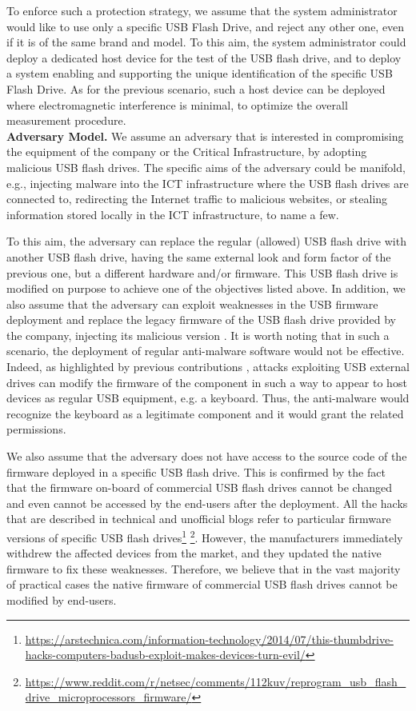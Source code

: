 \documentclass[acmsmall, authorversion]{acmart}
\begin{document}
To enforce such a protection strategy, we assume that the system administrator would like to use only a specific USB Flash Drive, and reject any other one, even if it is of the same brand and model. To this aim, the system administrator could deploy a dedicated host device for the test of the USB flash drive, and to deploy a system enabling and supporting the unique identification of the specific USB Flash Drive. As for the previous scenario, such a host device can be deployed where electromagnetic interference is minimal, to optimize the overall measurement procedure.
\\
{\bf Adversary Model.}  We assume an adversary that is interested in compromising the equipment of the company or the Critical Infrastructure, by adopting malicious USB flash drives. The specific aims of the adversary could be manifold, e.g., injecting malware into the ICT infrastructure where the USB flash drives are connected to, redirecting the Internet traffic to malicious websites, or stealing information stored locally in the ICT infrastructure, to name a few.

To this aim, the adversary can replace the regular (allowed) USB flash drive with another USB flash drive, having the same external look and form factor of the previous one, but a different hardware and/or firmware. This USB flash drive is modified on purpose to achieve one of the objectives listed above. 
In addition, we also assume that the adversary can exploit weaknesses in the USB firmware deployment and replace the legacy firmware of the USB flash drive provided by the company, injecting its malicious version \cite{badusbguide}.  
It is worth noting that in such a scenario, the deployment of regular anti-malware software would not be effective. Indeed, as highlighted by previous contributions \cite{Nissim2017}, attacks exploiting USB external drives can modify the firmware of the component in such a way to appear to host devices as regular USB equipment, e.g. a keyboard. Thus, the anti-malware would recognize the keyboard as a legitimate component and it would grant the related permissions.

We also assume that the adversary does not have access to the source code of the firmware deployed in a specific USB flash drive. This is confirmed by the fact that the firmware on-board of commercial USB flash drives cannot be changed and even cannot be accessed by the end-users after the deployment. All the hacks that are described in technical and unofficial blogs refer to particular firmware versions of specific USB flash drives\footnote{\url{https://arstechnica.com/information-technology/2014/07/this-thumbdrive-hacks-computers-badusb-exploit-makes-devices-turn-evil/}} \footnote{\url{https://www.reddit.com/r/netsec/comments/112kuv/reprogram_usb_flash_drive_microprocessors_firmware/}}. However, the manufacturers immediately withdrew the affected devices from the market, and they updated the native firmware to fix these weaknesses. Therefore, we believe that in the vast majority of practical cases the native firmware of commercial USB flash drives cannot be modified by end-users.
\end{document}
